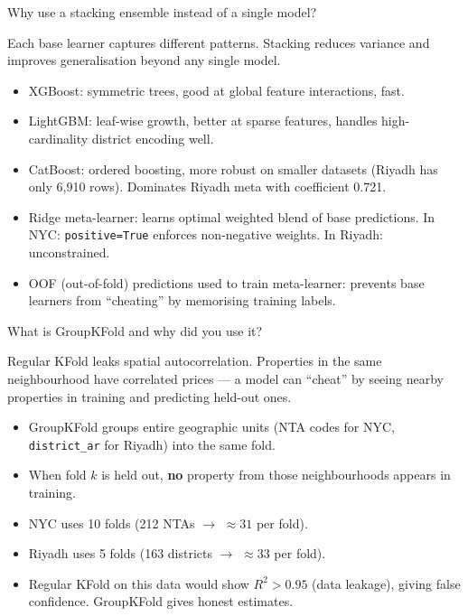 \documentclass[11pt, a4paper, twoside]{article}
\begin{document}
\begin{question}{Why use a stacking ensemble instead of a single model?}
\begin{shortanswer}
Each base learner captures different patterns. Stacking reduces variance and
improves generalisation beyond any single model.
\end{shortanswer}

\begin{detail}
\begin{itemize}
  \item XGBoost: symmetric trees, good at global feature interactions, fast.
  \item LightGBM: leaf-wise growth, better at sparse features, handles
        high-cardinality district encoding well.
  \item CatBoost: ordered boosting, more robust on smaller datasets (Riyadh
        has only 6,910 rows). Dominates Riyadh meta with coefficient 0.721.
  \item Ridge meta-learner: learns optimal weighted blend of base predictions.
        In NYC: \texttt{positive=True} enforces non-negative weights. In Riyadh:
        unconstrained.
  \item OOF (out-of-fold) predictions used to train meta-learner: prevents base
        learners from ``cheating'' by memorising training labels.
\end{itemize}
\end{detail}
\end{question}

\bigskip

\begin{question}{What is GroupKFold and why did you use it?}
\begin{shortanswer}
Regular KFold leaks spatial autocorrelation. Properties in the same
neighbourhood have correlated prices --- a model can ``cheat'' by seeing nearby
properties in training and predicting held-out ones.
\end{shortanswer}

\begin{detail}
\begin{itemize}
  \item GroupKFold groups entire geographic units (NTA codes for NYC,
        \texttt{district\_ar} for Riyadh) into the same fold.
  \item When fold $k$ is held out, \textbf{no} property from those
        neighbourhoods appears in training.
  \item NYC uses 10 folds (212 NTAs $\to$ $\approx 31$ per fold).
  \item Riyadh uses 5 folds (163 districts $\to$ $\approx 33$ per fold).
  \item Regular KFold on this data would show $R^2 > 0.95$ (data leakage),
        giving false confidence. GroupKFold gives honest estimates.
\end{itemize}
\end{detail}
\end{question}
\end{document}
